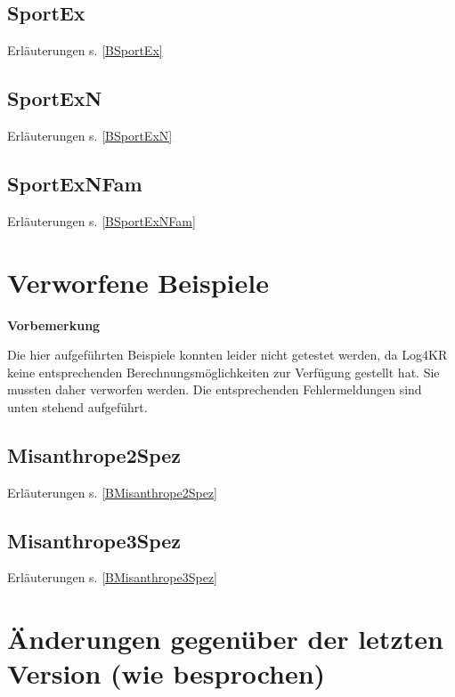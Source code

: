 \documentclass[a4paper, 11pt]{book}
\begin{document}
{\section{SportEx} Erläuterungen s. \ref{BSportEx}
\label{SportEx}

\newpage


\section{SportExN} Erläuterungen s. \ref{BSportExN}
\label{SportExN}



\newpage

\section{SportExNFam} Erläuterungen s. \ref{BSportExNFam}
\label{SportExNFam}



\newpage



\chapter{Verworfene Beispiele}
\label{examplesdep}
\textbf{Vorbemerkung}


\noindent
Die hier aufgeführten Beispiele konnten leider nicht getestet werden, da Log4KR keine entsprechenden Berechnungsmöglichkeiten zur Verfügung gestellt hat. Sie mussten daher verworfen werden. Die entsprechenden Fehlermeldungen sind unten stehend aufgeführt.

\section{Misanthrope2Spez} Erläuterungen s. \ref{BMisanthrope2Spez}
\label{Misanthrope2Spez}


\newpage


\section{Misanthrope3Spez} Erläuterungen s. \ref{BMisanthrope3Spez}
\label{Misanthrope3Spez}


\chapter{Änderungen gegenüber der letzten Version (wie besprochen)}

}
\end{document}
